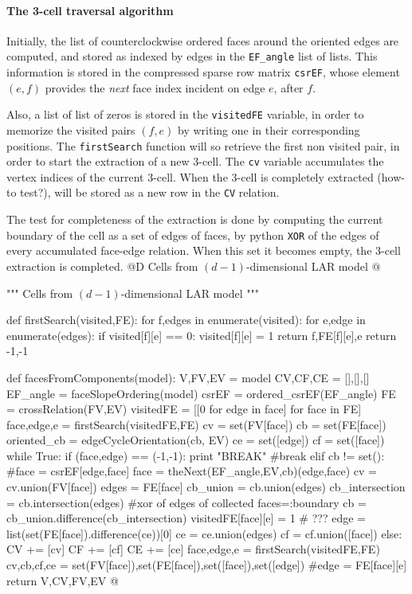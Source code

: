 \documentclass[11pt,oneside]{article}    %
\begin{document}
\paragraph{The 3-cell traversal algorithm}
Initially, the list of counterclockwise ordered faces around the oriented edges are computed, and stored as indexed by edges in the \texttt{EF\_angle} list of lists. This information is stored in the compressed sparse row matrix \texttt{csrEF}, whose element $(e,f)$ provides the \emph{next} face index  incident on edge $e$, after $f$. 

Also, a list of list of zeros is stored in the \texttt{visitedFE} variable, in order to memorize the visited pairs $(f,e)$ by writing one in their corresponding positions. The \texttt{firstSearch} function will so retrieve the first non visited pair, in order to start the extraction of a new 3-cell. The \texttt{cv} variable accumulates the vertex indices of the current 3-cell. When the 3-cell is completely extracted (how-to test?), will be stored as a new row in the \texttt{CV} relation. 

The test for completeness of the extraction is done by computing the current boundary of the cell as a set of edges of faces, by python \texttt{XOR} of the edges of every accumulated face-edge relation. When this set it becomes empty, the 3-cell extraction is completed.
@D Cells from $(d-1)$-dimensional LAR model
@{""" Cells from $(d-1)$-dimensional LAR model """

def firstSearch(visited,FE):
    for f,edges in enumerate(visited):
        for e,edge in enumerate(edges):
            if visited[f][e] == 0:
                visited[f][e] = 1
                return f,FE[f][e],e
    return -1,-1

def facesFromComponents(model):
    V,FV,EV = model
    CV,CF,CE = [],[],[]
    EF_angle = faceSlopeOrdering(model)
    csrEF = ordered_csrEF(EF_angle)
    FE = crossRelation(FV,EV)
    visitedFE = [[0 for edge in face] for face in FE]
    face,edge,e = firstSearch(visitedFE,FE)
    cv = set(FV[face])
    cb = set(FE[face])
    oriented_cb = edgeCycleOrientation(cb, EV)
    ce = set([edge])
    cf = set([face])
    while True:
        if (face,edge) == (-1,-1):
            print "BREAK"
            #break
        elif cb != set():  
            #face = csrEF[edge,face]
            face = theNext(EF_angle,EV,cb)(edge,face)
            cv = cv.union(FV[face])
            edges = FE[face]
            cb_union = cb.union(edges)
            cb_intersection = cb.intersection(edges)
            #xor of edges of collected faces=:boundary
            cb = cb_union.difference(cb_intersection) 
            visitedFE[face][e] = 1  # ???
            edge = list(set(FE[face]).difference(ce))[0]
            ce = ce.union(edges)
            cf = cf.union([face])
        else:
            CV += [cv]
            CF += [cf]
            CE += [ce]
            face,edge,e = firstSearch(visitedFE,FE)
            cv,cb,cf,ce = set(FV[face]),set(FE[face]),set([face]),set([edge])
            #edge = FE[face][e]
    return V,CV,FV,EV
@}
\end{document}
